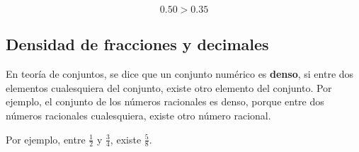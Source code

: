 \documentclass[12pt]{book}
\begin{document}
\begin{mainmatter}
    \[0.50>0.35\]

    \begin{center}
    \end{center}

    \subsection{Densidad de fracciones y decimales}

    En teoría de conjuntos, se dice que un conjunto numérico es \textbf{denso}, si entre dos elementos cualesquiera del conjunto, existe otro elemento del conjunto. Por ejemplo, el conjunto de los números racionales es denso, porque entre dos números racionales cualesquiera, existe otro número racional.

    Por ejemplo, entre $\frac{1}{2}$ y $\frac{3}{4}$, existe $\frac{5}{8}$.\\

\end{mainmatter}
\end{document}
